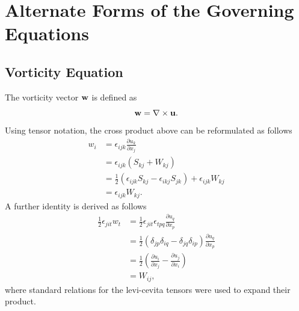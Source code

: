 \documentclass[oneside,a4paper,11pt]{report}
\begin{document}
%
\chapter{Alternate Forms of the Governing Equations}
%

\section{Vorticity Equation}

The vorticity vector $\mathbf{w}$ is defined as
\begin{equation}
\mathbf{w} = \nabla \times \mathbf{u}.
\end{equation}
Using tensor notation, the cross product above can be reformulated as follows
\begin{align}
w_i & = \epsilon_{ijk} \frac{\partial u_k}{\partial x_j} \nonumber \\
& = \epsilon_{ijk} (S_{kj} + W_{kj}) \nonumber \\
& = \frac{1}{2} (\epsilon_{ijk} S_{kj} - \epsilon_{ikj} S_{jk}) + \epsilon_{ijk} W_{kj} \nonumber \\
& = \epsilon_{ijk}W_{kj}.
\end{align}
A further identity is derived as follows
\begin{align}
\frac{1}{2} \epsilon_{jit} w_t &= \frac{1}{2} \epsilon_{jit} \epsilon_{tpq} \frac{\partial u_q}{\partial x_p} \nonumber \\
&= \frac{1}{2} (\delta_{jp} \delta_{iq} - \delta_{jq} \delta_{ip}) \frac{\partial u_q}{\partial x_p} \nonumber \\
&= \frac{1}{2} \left (\frac{\partial u_i}{\partial x_j} - \frac{\partial u_j}{\partial x_i} \right ) \nonumber \\
&= W_{ij},
\end{align}
where standard relations for the levi-cevita tensors were used to expand their product.
\end{document}
